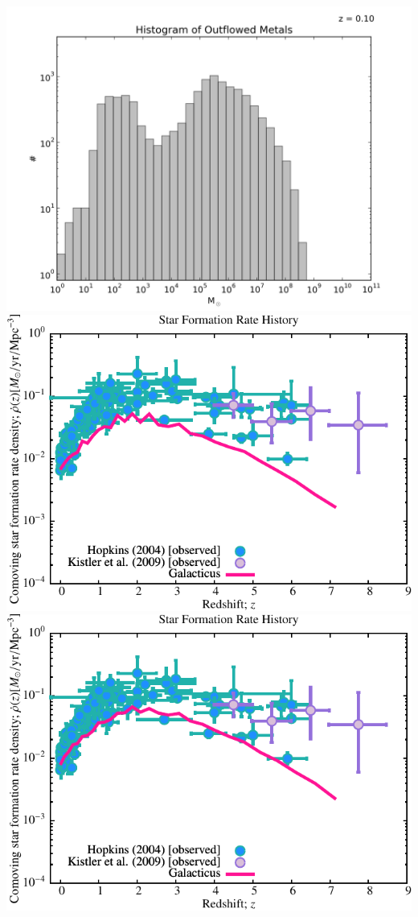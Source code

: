 \begin{itemize}
\includegraphics[scale=0.5]{analysis/galacticus/histograms/Histogram_of_Outflowed_Metalsgalacticus_nestages_SLtest2_0000.png} \\
\includegraphics[scale=0.75]{r256/h70/nestages12/Plot_Star_Formation_History.pdf} \\
\includegraphics[scale=0.75]{r256/h70/nestages12_SLtest/Plot_Star_Formation_History.pdf} \\

\end{itemize}
